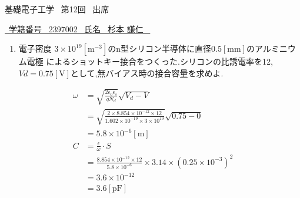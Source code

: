 \documentclass{classes/report}
\begin{document}
基礎電子工学 \ 第12回 \ 出席
\begin{flushright}
    \underline{\ 学籍番号 \ 2397002 \ 氏名 \ 杉本 謙仁 \ }
\end{flushright}

\bigskip

\begin{enumerate}
    \item 電子密度 $3 \times 10^{19} [\mathrm{m}^{-3}]$のn型シリコン半導体に直径$0.5[\mathrm{mm}]$のアルミニウム電極
          によるショットキー接合をつくった.シリコンの比誘電率を12,$Vd = 0.75 [\mathrm{V}]$として,無バイアス時の接合容量を求めよ.
\end{enumerate}

\begin{equation}
    \begin{split}
        \omega & = \sqrt{\frac{2\epsilon_0 \epsilon_s}{qN_d}} \sqrt{V_d - V}                                                             \\
               & = \sqrt{\frac{2 \times 8.854 \times 10^{-12} \times 12}{1.602 \times 10^{-19} \times 3 \times 10^{19}}} \sqrt{0.75 - 0} \\
               & = 5.8 \times 10^{-6} [\mathrm{m}]                                                                                       \\
        C      & = \frac{\epsilon}{\omega} \cdot S                                                                                       \\
               & = \frac{8.854 \times 10^{-12} \times 12}{5.8 \times 10^{-6}} \times 3.14 \times \left(0.25 \times 10^{-3} \right)^2     \\
               & = 3.6 \times 10^{-12}                                                                                                   \\
               & = 3.6 [\mathrm{pF}]
    \end{split}
\end{equation}
\end{document}
